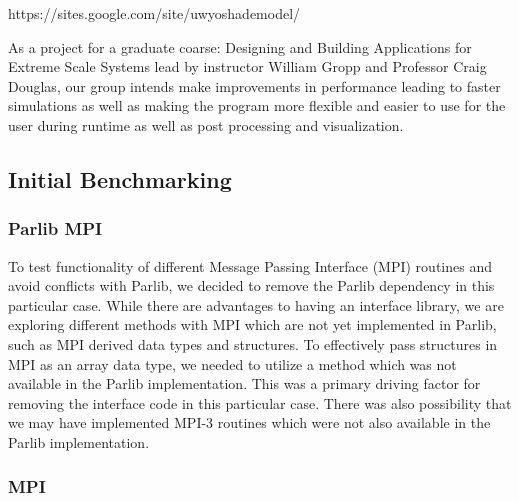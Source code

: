 \documentclass[]{article}%
\begin{document}
https://sites.google.com/site/uwyoshademodel/

As a project for a graduate coarse: Designing and Building Applications for Extreme Scale Systems lead by instructor William Gropp and Professor Craig Douglas, our group intends make improvements in performance leading to faster simulations as well as making the program more flexible and easier to use for the user during runtime as well as post processing and visualization.

\subsection{Initial Benchmarking}

\subsubsection{Parlib MPI}

To test functionality of different Message Passing Interface (MPI) routines and avoid conflicts with Parlib, we decided to remove the Parlib dependency in this particular case. While there are advantages to having an interface library, we are exploring different methods with MPI which are not yet implemented in Parlib, such as MPI derived data types and structures. To effectively pass structures in MPI as an array data type, we needed to utilize a method which was not available in the Parlib implementation. This was a primary driving factor for removing the interface code in this particular case. There was also possibility that we may have implemented MPI-3 routines which were not also available in the Parlib implementation.
\subsubsection{MPI}
\end{document}
